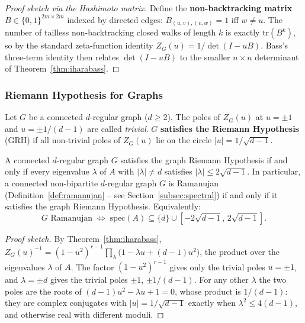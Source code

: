 \begin{proof}[Proof sketch via the Hashimoto matrix]
Define the \textbf{non-backtracking matrix} $B \in \{0, 1\}^{2m \times 2m}$
indexed by directed edges:
$B_{(u,v),(v,w)} = 1$ iff $w \ne u$.
The number of tailless non-backtracking closed walks of length $k$ is
exactly $\mathrm{tr}(B^k)$, so by the standard zeta-function identity
$Z_G(u) = 1/\det(I - u B)$. Bass's three-term identity then relates
$\det(I - uB)$ to the smaller $n \times n$ determinant of
Theorem~\ref{thm:iharabass}.
\end{proof}

\subsubsection{Riemann Hypothesis for Graphs}

\begin{definition}
Let $G$ be a connected $d$-regular graph ($d \ge 2$). The poles of
$Z_G(u)$ at $u = \pm 1$ and $u = \pm 1/(d - 1)$ are called
\emph{trivial}. $G$ \textbf{satisfies the Riemann Hypothesis}
(GRH) if all non-trivial poles of $Z_G(u)$ lie on the circle
$|u| = 1/\sqrt{d - 1}$.
\end{definition}

\begin{theorem}\label{thm:ramanujangrh}
A connected $d$-regular graph $G$ satisfies the graph Riemann
Hypothesis if and only if every eigenvalue $\lambda$ of $A$ with
$|\lambda| \ne d$ satisfies $|\lambda| \le 2\sqrt{d - 1}$. In
particular, a connected non-bipartite $d$-regular graph $G$ is Ramanujan
(Definition~\ref{def:ramanujan} -- see Section~\ref{subsec:spectral}) if and only if it
satisfies the graph Riemann Hypothesis. Equivalently:
\[
  G \text{ Ramanujan} \;\Longleftrightarrow\;
  \text{spec}(A) \subseteq \{d\} \cup [-2\sqrt{d - 1},\, 2\sqrt{d - 1}].
\]
\end{theorem}

\begin{proof}[Proof sketch]
By Theorem~\ref{thm:iharabass},
$Z_G(u)^{-1} = (1 - u^2)^{r - 1} \prod_{\lambda} \big(1 - \lambda u + (d - 1) u^2\big)$,
the product over the eigenvalues $\lambda$ of $A$. The factor
$(1 - u^2)^{r-1}$ gives only the trivial poles $u = \pm 1$, and
$\lambda = \pm d$ gives the trivial poles $\pm 1$, $\pm 1/(d - 1)$. For
any other $\lambda$ the two poles are the roots of
$(d - 1)u^2 - \lambda u + 1 = 0$, whose product is $1/(d - 1)$: they are
complex conjugates with $|u| = 1/\sqrt{d - 1}$ exactly when
$\lambda^2 \le 4(d - 1)$, and otherwise real with different moduli.
\end{proof}


